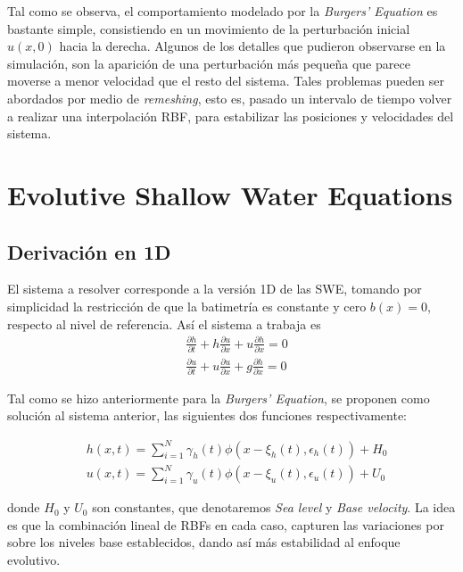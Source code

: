\documentclass[spanish]{article}
\begin{document}
    Tal como se observa, el comportamiento modelado por la \textit{Burgers' Equation} es bastante simple, consistiendo en un
    movimiento de la perturbación inicial $u(x,0)$ hacia la derecha. Algunos de los detalles que pudieron
    observarse en la simulación, son la aparición de una perturbación más pequeña que parece moverse a menor velocidad que el
    resto del sistema. Tales problemas pueden ser abordados por medio de \textit{remeshing}, esto es, pasado un intervalo de tiempo volver a realizar una interpolación RBF, para estabilizar las posiciones y velocidades del sistema.
    
    \section{Evolutive Shallow Water Equations}

    \subsection{Derivación en 1D}

    El sistema a resolver corresponde a la versión 1D de las SWE, tomando por simplicidad la restricción de que la batimetría es constante y cero $b(x)=0$, respecto al nivel de referencia. Así el sistema a trabaja es
\begin{align}
 & \frac{\partial h}{\partial t} + h \frac{\partial u}{\partial x} + u \frac{\partial h}{\partial x} = 0 \label{eq:continuity}\\
 & \frac{\partial u}{\partial t} + u \frac{\partial u}{\partial x} + g \frac{\partial h}{\partial x} = 0 \label{eq:momentum}
\end{align}

    Tal como se hizo anteriormente para la \textit{Burgers' Equation}, se proponen como solución al sistema anterior, las siguientes dos funciones respectivamente:

\begin{align}
     & h(x,t) = \sum_{i=1}^{N} \gamma_h(t)\phi(x-\xi_h(t),\epsilon_h(t)) + H_0 \label{eq:happ}\\
     & u(x,t) = \sum_{i=1}^{N} \gamma_u(t)\phi(x-\xi_u(t),\epsilon_u(t)) + U_0 \label{eq:uapp}
 \end{align}

     donde $H_0$ y $U_0$ son constantes, que denotaremos \textit{Sea level} y \textit{Base velocity}. La idea es que la
     combinación lineal de RBFs en cada caso, capturen las variaciones por sobre los niveles base establecidos, dando así
     más estabilidad al enfoque evolutivo.
\end{document}

